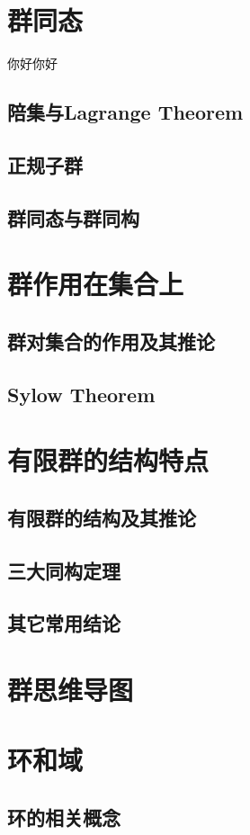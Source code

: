 \documentclass[zihao=-4,UTF8]{report}
\begin{document}
\section{群同态}
你好你好
\subsection{陪集与Lagrange Theorem}
\subsection{正规子群}
\subsection{群同态与群同构}

\section{群作用在集合上}
\subsection{群对集合的作用及其推论}
\subsection{Sylow Theorem}

\section{有限群的结构特点}
\subsection{有限群的结构及其推论}
\subsection{三大同构定理}
\subsection{其它常用结论}

\section{群思维导图}

\section{环和域}
\subsection{环的相关概念}
\end{document}
